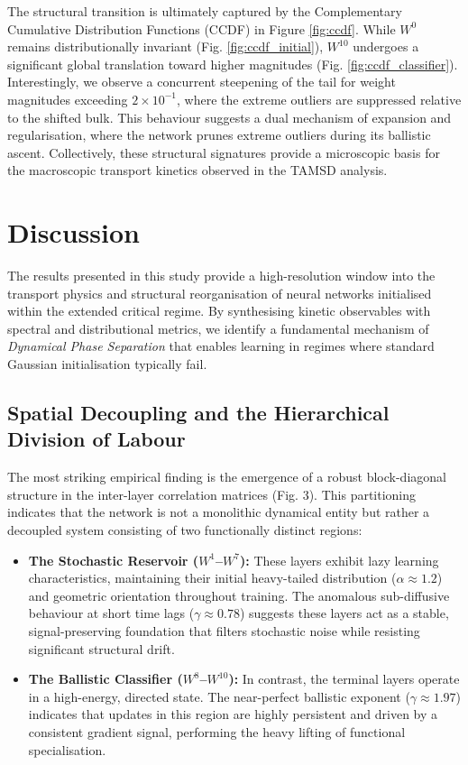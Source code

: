\documentclass[11pt,a4paper]{article}
\begin{document}
The structural transition is ultimately captured by the Complementary Cumulative Distribution Functions (CCDF) in Figure \ref{fig:ccdf}. While $W^{0}$ remains distributionally invariant (Fig. \ref{fig:ccdf_initial}), $W^{10}$ undergoes a significant global translation toward higher magnitudes (Fig. \ref{fig:ccdf_classifier}). Interestingly, we observe a concurrent steepening of the tail for weight magnitudes exceeding $2 \times 10^{-1}$, where the extreme outliers are suppressed relative to the shifted bulk. This behaviour suggests a dual mechanism of expansion and regularisation, where the network prunes extreme outliers during its ballistic ascent. Collectively, these structural signatures provide a microscopic basis for the macroscopic transport kinetics observed in the TAMSD analysis.
\newpage
\section{Discussion}
The results presented in this study provide a high-resolution window into the transport physics and structural reorganisation of neural networks initialised within the extended critical regime. By synthesising kinetic observables with spectral and distributional metrics, we identify a fundamental mechanism of \textit{Dynamical Phase Separation} that enables learning in regimes where standard Gaussian initialisation typically fail.

\subsection{Spatial Decoupling and the Hierarchical Division of Labour}

The most striking empirical finding is the emergence of a robust block-diagonal structure in the inter-layer correlation matrices (Fig. 3). This partitioning indicates that the network is not a monolithic dynamical entity but rather a decoupled system consisting of two functionally distinct regions:

\begin{itemize}
	\item \textbf{The Stochastic Reservoir ($W^1$--$W^7$):} These layers exhibit lazy learning characteristics, maintaining their initial heavy-tailed distribution ($\alpha \approx 1.2$) and geometric orientation throughout training. The anomalous sub-diffusive behaviour at short time lags ($\gamma \approx 0.78$) suggests these layers act as a stable, signal-preserving foundation that filters stochastic noise while resisting significant structural drift.
	\item \textbf{The Ballistic Classifier ($W^8$--$W^{10}$):} In contrast, the terminal layers operate in a high-energy, directed state. The near-perfect ballistic exponent ($\gamma \approx 1.97$) indicates that updates in this region are highly persistent and driven by a consistent gradient signal, performing the heavy lifting of functional specialisation.
\end{itemize}
\end{document}

